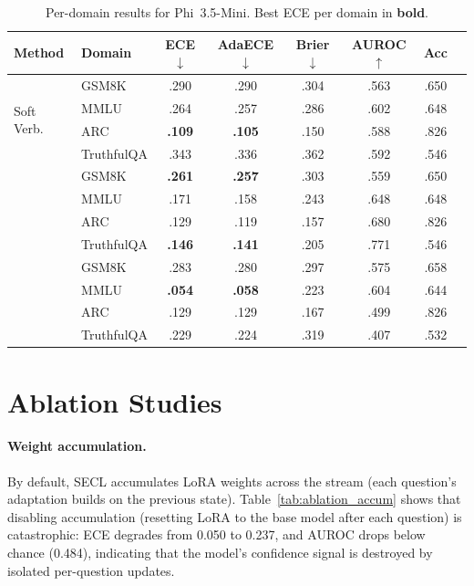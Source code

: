 \begin{table}[h]
\centering
\caption{Per-domain results for Phi~3.5-Mini.
Best ECE per domain in \textbf{bold}.}
\label{tab:per_domain_phi}
\small
\begin{tabular}{@{}llcccccc@{}}
\toprule
\textbf{Method} & \textbf{Domain}
  & \textbf{ECE}$\downarrow$ & \textbf{AdaECE}$\downarrow$ & \textbf{Brier}$\downarrow$
  & \textbf{AUROC}$\uparrow$ & \textbf{Acc} \\
\midrule
\multirow{4}{*}{Soft Verb.}
  & GSM8K      & .290 & .290 & .304 & .563 & .650 \\
  & MMLU       & .264 & .257 & .286 & .602 & .648 \\
  & ARC        & \textbf{.109} & \textbf{.105} & .150 & .588 & .826 \\
  & TruthfulQA & .343 & .336 & .362 & .592 & .546 \\
\addlinespace
\multirow{4}{*}{P(True) Norm}
  & GSM8K      & \textbf{.261} & \textbf{.257} & .303 & .559 & .650 \\
  & MMLU       & .171 & .158 & .243 & .648 & .648 \\
  & ARC        & .129 & .119 & .157 & .680 & .826 \\
  & TruthfulQA & \textbf{.146} & \textbf{.141} & .205 & .771 & .546 \\
\addlinespace
\multirow{4}{*}{SECL}
  & GSM8K      & .283 & .280 & .297 & .575 & .658 \\
  & MMLU       & \textbf{.054} & \textbf{.058} & .223 & .604 & .644 \\
  & ARC        & .129 & .129 & .167 & .499 & .826 \\
  & TruthfulQA & .229 & .224 & .319 & .407 & .532 \\
\bottomrule
\end{tabular}
\end{table}


\section{Ablation Studies} \label{app:ablations}

\paragraph{Weight accumulation.}
By default, SECL accumulates LoRA weights across the stream
(each question's adaptation builds on the previous state).
Table~\ref{tab:ablation_accum} shows that disabling accumulation
(resetting LoRA to the base model after each question)
is catastrophic: ECE degrades from 0.050 to 0.237, and AUROC
drops below chance (0.484), indicating that the model's confidence
signal is destroyed by isolated per-question updates.

